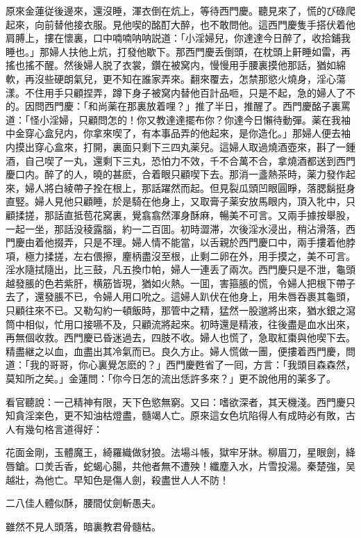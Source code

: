 原來金蓮従後邊來，還沒睡，渾衣倒在炕上，等待西門慶。聽見來了，慌的ぴ碌爬起來，向前替他接衣服。見他喫的酩酊大醉，也不敢問他。這西門慶隻手搭伏着他肩膊上，摟在懷裏，口中喃喃呐呐説道：「小淫婦兒，你達達今日醉了，收拾鋪我睡也。」那婦人扶他上炕，打發他歇下。那西門慶丢倒頭，在枕頭上鼾睡如雷，再搖也搖不醒。然後婦人脱了衣裳，鑽在被窝内，慢慢用手腰裏摸他那話，猶如綿軟，再沒些硬朗氣兒，更不知在誰家弄來。翻來覆去，怎禁那慾火燒身，淫心蕩漾。不住用手只顧捏弄，蹲下身子被窝内替他百計品咂，只是不起，急的婦人了不的。因問西門慶：「和尚薬在那裏放着哩？」推了半日，推醒了。西門慶酩子裏罵道：「怪小淫婦，只顧問怎的！你又教達達擺布你？你達今日懶待動彈。薬在我袖中金穿心盒兒内，你拿來喫了，有本事品弄的他起來，是你造化。」那婦人便去袖内摸出穿心盒來，打開，裏面只剩下三四丸薬兒。這婦人取過燒酒壺來，斟了一鍾酒，自己喫了一丸，還剩下三丸，恐怕力不效，千不合萬不合，拿燒酒都送到西門慶口内。醉了的人，曉的甚麽，合着眼只顧喫下去。那消一盞熱茶時，薬力發作起來，婦人將白綾帶子拴在根上，那話躍然而起。但見裂瓜頭凹眼圓睜，落腮鬍挺身直竪。婦人見他只顧睡，於是騎在他身上，又取膏子薬安放馬眼内，頂入牝中，只顧揉搓，那話直抵苞花窝裏，覺翕翕然渾身酥麻，暢美不可言。又兩手據按舉股，一起一坐，那話没稜露腦，約一二百囬。初時澀滞，次後淫水浸出，稍沾滑落，西門慶由着他掇弄，只是不理。婦人情不能當，以舌親於西門慶口中，兩手摟着他脖項，極力揉搓，左右偎擦，麈柄盡沒至根，止剩二卵在外，用手摸之，美不可言。淫水隨拭隨出，比三鼓，凡五換巾帕，婦人一連丢了兩次。西門慶只是不泄，龜頭越發脹的色若紫肝，横筋皆現，猶如火熱。一囬，害箍脹的慌，令婦人把根下帶子去了，還發脹不已，令婦人用口吮之。這婦人趴伏在他身上，用朱唇吞裹其龜頭，只顧往來不已。又勒勾約一頓飯時，那管中之精，猛然一股邈將出來，猶水銀之瀉筒中相似，忙用口接嚥不及，只顧流將起來。初時還是精液，往後盡是血水出來，再無個收救。西門慶已昏迷過去，四肢不收。婦人也慌了，急取紅棗與他喫下去。精盡継之以血，血盡出其冷氣而已。良久方止。婦人慌做一團，便摟着西門慶，問道：「我的哥哥，你心裏覺怎麽的？」西門慶甦省了一囘，方言：「我頭目森森然，莫知所之矣。」金蓮問：「你今日怎的流出恁許多來？」更不說他用的薬多了。

看官聽說：一己精神有限，天下色慾無窮。又曰：嗜欲深者，其天機淺。西門慶只知貪淫楽色，更不知油枯燈盡，髓竭人亡。原來這女色坑陷得人有成時必有敗，古人有幾句格言道得好：

花面金剛，玉體魔王，綺羅織做豺狼。法場斗帳，獄牢牙牀。柳眉刀，星眼劍，絳唇鎗。口羙舌香，蛇蝎心腸，共他者無不遭殃！纖塵入水，片雪投湯。秦楚強，吴越壯，為他亡。早知色是傷人劍，殺盡世人人不防！

二八佳人體似酥，腰間仗劍斬愚夫。

雖然不見人頭落，暗裏教君骨髓枯。

